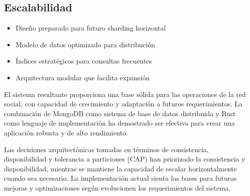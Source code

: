 \documentclass[12pt,letterpaper]{article}
\begin{document}
\subsection{Escalabilidad}
\begin{itemize}
    \item Diseño preparado para futuro sharding horizontal
    \item Modelo de datos optimizado para distribución
    \item Índices estratégicos para consultas frecuentes
    \item Arquitectura modular que facilita expansión
\end{itemize}

El sistema resultante proporciona una base sólida para las operaciones de la red social, con capacidad de crecimiento y adaptación a futuros requerimientos. La combinación de MongoDB como sistema de base de datos distribuida y Rust como lenguaje de implementación ha demostrado ser efectiva para crear una aplicación robusta y de alto rendimiento.

Las decisiones arquitectónicas tomadas en términos de consistencia, disponibilidad y tolerancia a particiones (CAP) han priorizado la consistencia y disponibilidad, mientras se mantiene la capacidad de escalar horizontalmente cuando sea necesario. La implementación actual sienta las bases para futuras mejoras y optimizaciones según evolucionen los requerimientos del sistema.
\end{document}
